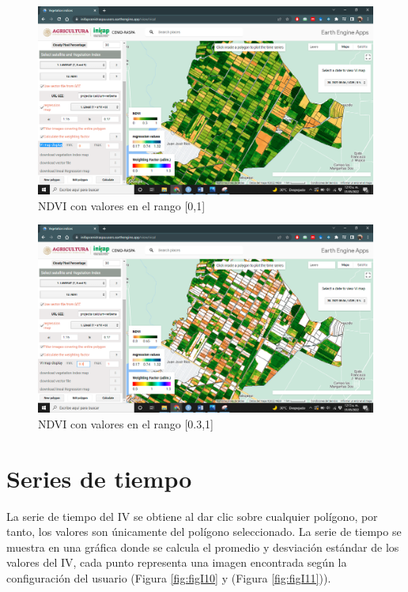 \documentclass[
]{book}
\begin{document}
\begin{figure}

{\centering \includegraphics[width=0.85\linewidth]{./images/Figure58} 

}

\caption{NDVI con valores en el rango [0,1]}\label{fig:figI8}
\end{figure}

\begin{figure}

{\centering \includegraphics[width=0.85\linewidth]{./images/Figure59} 

}

\caption{NDVI con valores en el rango [0.3,1]}\label{fig:figI9}
\end{figure}

\hypertarget{series-de-tiempo}{%
\section{Series de tiempo}\label{series-de-tiempo}}

La serie de tiempo del IV se obtiene al dar clic sobre cualquier polígono, por tanto, los valores son únicamente del polígono seleccionado. La serie de tiempo se muestra en una gráfica donde se calcula el promedio y desviación estándar de los valores del IV, cada punto representa una imagen encontrada según la configuración del usuario (Figura \ref{fig:figI10} y (Figura \ref{fig:figI11})).
\end{document}
